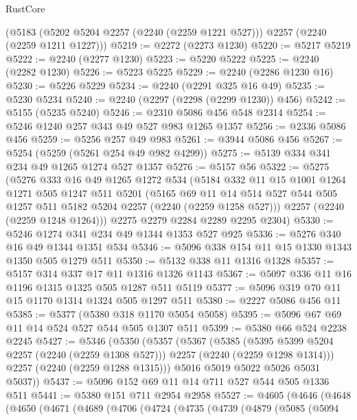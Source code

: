 \begin{lexlean}{RustCore}
\begin{coremodule}
    (@5183 (@5202 @5204 @2257 (@2240 (@2259 @1221 @527))) @2257 (@2240 (@2259 @1211 @1227)))
@5219 := @2272 (@2273 @1230)
@5220 := @5217 @5219
@5222 := @2240 (@2277 @1230)
@5223 := @5220 @5222
@5225 := @2240 (@2282 @1230)
@5226 := @5223 @5225
@5229 := @2240 (@2286 @1230 @16)
@5230 := @5226 @5229
@5234 := @2240 (@2291 @325 @16 @49)
@5235 := @5230 @5234
@5240 := @2240 (@2297 (@2298 (@2299 @1230)) @456)
@5242 := @5155 (@5235 @5240)
@5246 := @2310 @5086 @456 @548 @2314
@5254 := @5246 @1240 @257 @343 @49 @527 @983 @1265 @1357
@5256 := @2336 @5086 @456
@5259 := @5256 @257 @49 @983
@5261 := @3944 @5086 @456
@5267 := @5254 (@5259 (@5261 @254 @49 @982 @4299))
@5275 := @5139 @334 @341 @234 @49 @1265 @1274 @527 @1357
@5276 := @5157 @56
@5322 := @5275
    (@5276
      @333
      @16
      @49
      @1265
      @1272
      @534
      (@5184
        @332
        @11
        @15
        @1001
        @1264
        @1271
        @505
        @1247
        @511
        @5201
        (@5165
          @69
          @11
          @14
          @514
          @527
          @544
          @505
          @1257
          @511
          @5182
          @5204
          @2257
          (@2240 (@2259 @1258 @527)))
        @2257
        (@2240 (@2259 @1248 @1264)))
      @2275
      @2279
      @2284
      @2289
      @2295
      @2304)
@5330 := @5246 @1274 @341 @234 @49 @1344 @1353 @527 @925
@5336 := @5276 @340 @16 @49 @1344 @1351 @534
@5346 := @5096 @338 @154 @11 @15 @1330 @1343 @1350 @505 @1279 @511
@5350 := @5132 @338 @11 @1316 @1328
@5357 := @5157 @314 @337 @17 @11 @1316 @1326 @1143
@5367 := @5097 @336 @11 @16 @1196 @1315 @1325 @505 @1287 @511 @5119
@5377 := @5096 @319 @70 @11 @15 @1170 @1314 @1324 @505 @1297 @511
@5380 := @2227 @5086 @456 @11
@5385 := @5377 (@5380 @318 @1170 @5054 @5058)
@5395 := @5096 @67 @69 @11 @14 @524 @527 @544 @505 @1307 @511
@5399 := @5380 @66 @524 @2238 @2245
@5427 := @5346
    (@5350
      (@5357
        (@5367
          (@5385
            (@5395 @5399 @5204 @2257 (@2240 (@2259 @1308 @527)))
            @2257
            (@2240 (@2259 @1298 @1314)))
          @2257
          (@2240 (@2259 @1288 @1315)))
        @5016
        @5019
        @5022
        @5026
        @5031
        @5037))
@5437 := @5096 @152 @69 @11 @14 @711 @527 @544 @505 @1336 @511
@5441 := @5380 @151 @711 @2954 @2958
@5527 := @4605
    (@4646
      (@4648
        (@4650
          (@4671
            (@4689
              (@4706
                (@4724
                  (@4735
                    (@4739
                      (@4879
                        (@5085
                          (@5094

\end{coremodule}
\end{lexlean}
